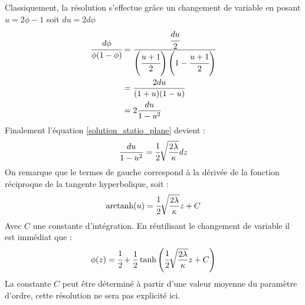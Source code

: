 Classiquement, la résolution s'effectue grâce un changement de variable en posant $u = 2\phi - 1$ soit $du = 2d\phi$
\begin{align*}
	 \cfrac{d\phi}{\phi(1-\phi)} &= \cfrac{\cfrac{du}{2}}{\left(\cfrac{u+1}{2}\right)\left( 1 -\cfrac{u+1}{2}\right)} \\
	 & = \frac{2du}{(1+u)(1-u)} \\
	 & = 2\frac{du}{1-u^2}
\end{align*}
Finalement l'équation \ref{solution_statio_plane} devient :
\begin{equation}
	\frac{du}{1-u^2} = \cfrac{1}{2}\sqrt{\frac{2\lambda}{\kappa}}dz
\end{equation}
On remarque que le termes de gauche correspond à la dérivée de la fonction réciproque de la tangente hyperbolique, soit :
\begin{equation}
	\text{arctanh}(u) = \cfrac{1}{2}\sqrt{\frac{2\lambda}{\kappa}} z + C
\end{equation}
Avec $C$ une constante d'intégration.
En réutilisant le changement de variable il est immédiat que :
 \begin{equation}
 \phi(z) = \cfrac{1}{2} + \frac{1}{2}\tanh \left(\cfrac{1}{2}\sqrt{\frac{2\lambda}{\kappa}}z +C\right)
 \end{equation}
La constante $C$ peut être déterminé à partir d'une valeur moyenne du paramètre d'ordre, cette résolution ne sera pas explicité ici.





